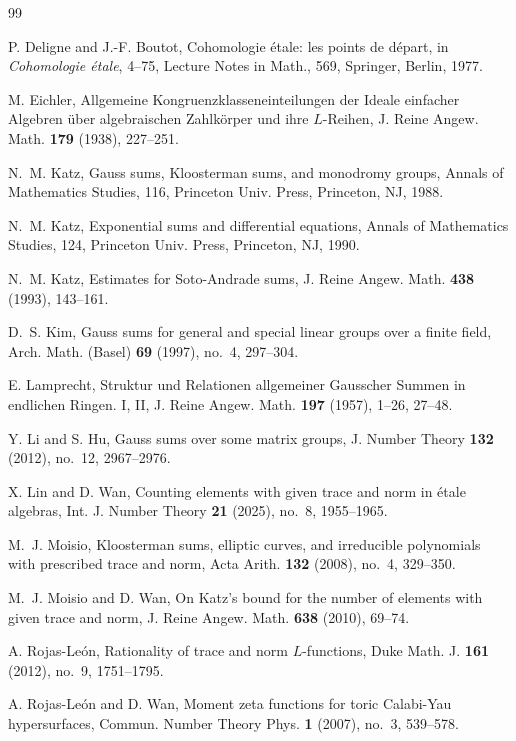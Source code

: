 \documentclass[11pt]{amsart}
\theoremstyle{remark}
\begin{document}
\begin{thebibliography}{99}

P. Deligne and J.-F. Boutot, Cohomologie \'etale: les points de d\'epart, in {\it Cohomologie \'etale}, 4--75, Lecture Notes in Math., 569, Springer, Berlin, 1977.

M. Eichler, Allgemeine Kongruenzklasseneinteilungen der Ideale einfacher Algebren \"uber algebraischen Zahlk\"orper und ihre $L$-Reihen, J. Reine Angew. Math. {\bf 179} (1938), 227--251.

N.~M. Katz, Gauss sums, Kloosterman sums, and monodromy groups, Annals of Mathematics Studies, 116, Princeton Univ. Press, Princeton, NJ, 1988.

N.~M. Katz, Exponential sums and differential equations, Annals of Mathematics Studies, 124, Princeton Univ. Press, Princeton, NJ, 1990.

N.~M. Katz, Estimates for Soto-Andrade sums, J. Reine Angew. Math. {\bf 438} (1993), 143--161.


D.~S. Kim, Gauss sums for general and special linear groups over a finite field, Arch. Math. (Basel) {\bf 69} (1997), no.~4, 297--304.

E. Lamprecht, Struktur und Relationen allgemeiner Gausscher Summen in endlichen Ringen. I, II, J. Reine Angew. Math. {\bf 197} (1957), 1--26, 27--48.

Y. Li and S. Hu, Gauss sums over some matrix groups, J. Number Theory {\bf 132} (2012), no.~12, 2967--2976.

X. Lin and D. Wan, Counting elements with given trace and norm in \'etale algebras, Int. J. Number Theory {\bf 21} (2025), no.~8, 1955--1965.


M.~J. Moisio, Kloosterman sums, elliptic curves, and irreducible polynomials with prescribed trace and norm, Acta Arith. {\bf 132} (2008), no.~4, 329--350.

M.~J. Moisio and D. Wan, On Katz's bound for the number of elements with given trace and norm, J. Reine Angew. Math. {\bf 638} (2010), 69--74.

A. Rojas-Le\'on, Rationality of trace and norm $L$-functions, Duke Math. J. {\bf 161} (2012), no.~9, 1751--1795.


A. Rojas-Le\'on and D. Wan, Moment zeta functions for toric Calabi-Yau hypersurfaces, Commun. Number Theory Phys. {\bf 1} (2007), no.~3, 539--578.


\end{thebibliography}
\end{document}
